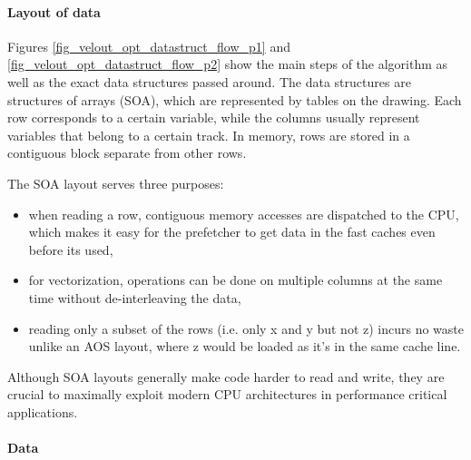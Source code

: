 \documentclass[12pt]{article}
\begin{document}
\paragraph{Layout of data} \mbox{}\vspace{0.4pc}

Figures \ref{fig_velout_opt_datastruct_flow_p1} and \ref{fig_velout_opt_datastruct_flow_p2} show the main steps of the algorithm as well as the exact data structures passed around. The data structures are structures of arrays (SOA), which are represented by tables on the drawing. Each row corresponds to a certain variable, while the columns usually represent variables that belong to a certain track. In memory, rows are stored in a contiguous block separate from other rows.

The SOA layout serves three purposes:
\begin{itemize}
	\item when reading a row, contiguous memory accesses are dispatched to the CPU, which makes it easy for the prefetcher to get data in the fast caches even before its used,
	\item for vectorization, operations can be done on multiple columns at the same time without de-interleaving the data,
	\item reading only a subset of the rows (i.e. only x and y but not z) incurs no waste unlike an AOS layout, where z would be loaded as it's in the same cache line.
\end{itemize}

Although SOA layouts generally make code harder to read and write, they are crucial to maximally exploit modern CPU architectures in performance critical applications.

\paragraph{Data} \mbox{}\vspace{0.4pc}
\end{document}

